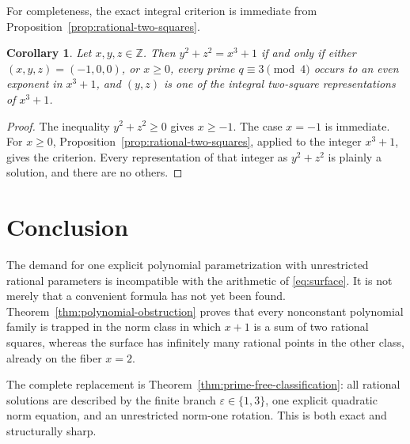 \documentclass[11pt,a4paper]{article}
\numberwithin{equation}{section}
\newtheorem{corollary}[theorem]{Corollary}
\theoremstyle{definition}
\newcommand{\Z}{\mathbb Z}
\begin{document}
For completeness, the exact integral criterion is immediate from
Proposition~\ref{prop:rational-two-squares}.

\begin{corollary}
Let $x,y,z\in\Z$.  Then $y^2+z^2=x^3+1$ if and only if either
$(x,y,z)=(-1,0,0)$, or $x\ge0$, every prime $q\equiv3\pmod4$ occurs to an
even exponent in $x^3+1$, and $(y,z)$ is one of the integral two-square
representations of $x^3+1$.
\end{corollary}

\begin{proof}
The inequality $y^2+z^2\ge0$ gives $x\ge-1$.  The case $x=-1$ is immediate.
For $x\ge0$, Proposition~\ref{prop:rational-two-squares}, applied to the
integer $x^3+1$, gives the criterion.  Every representation of that integer
as $y^2+z^2$ is plainly a solution, and there are no others.
\end{proof}

\section{Conclusion}

The demand for one explicit polynomial parametrization with unrestricted
rational parameters is incompatible with the arithmetic of
\eqref{eq:surface}.  It is not merely that a convenient formula has not yet
been found.  Theorem~\ref{thm:polynomial-obstruction} proves that every
nonconstant polynomial family is trapped in the norm class in which $x+1$ is
a sum of two rational squares, whereas the surface has infinitely many
rational points in the other class, already on the fiber $x=2$.

The complete replacement is Theorem~\ref{thm:prime-free-classification}:
all rational solutions are described by the finite branch
$\varepsilon\in\{1,3\}$, one explicit quadratic norm equation, and an
unrestricted norm-one rotation.  This is both exact and structurally sharp.
\end{document}

